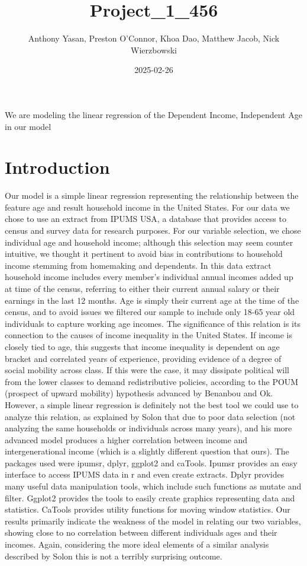 \documentclass[
]{article}
\title{Project\_1\_456}
\author{Anthony Yasan, Preston O'Connor, Khoa Dao, Matthew Jacob, Nick
Wierzbowski}
\date{2025-02-26}
\begin{document}
\maketitle

We are modeling the linear regression of the Dependent Income,
Independent Age in our model

\section{Introduction}\label{introduction}

Our model is a simple linear regression representing the relationship
between the feature age and result household income in the United
States. For our data we chose to use an extract from IPUMS USA, a
database that provides access to census and survey data for research
purposes. For our variable selection, we chose individual age and
household income; although this selection may seem counter intuitive, we
thought it pertinent to avoid bias in contributions to household income
stemming from homemaking and dependents. In this data extract household
income includes every member's individual annual incomes added up at
time of the census, referring to either their current annual salary or
their earnings in the last 12 months. Age is simply their current age at
the time of the census, and to avoid issues we filtered our sample to
include only 18-65 year old individuals to capture working age incomes.
The significance of this relation is its connection to the causes of
income inequality in the United States. If income is closely tied to
age, this suggests that income inequality is dependent on age bracket
and correlated years of experience, providing evidence of a degree of
social mobility across class. If this were the case, it may dissipate
political will from the lower classes to demand redistributive policies,
according to the POUM (prospect of upward mobility) hypothesis advanced
by Benanbou and Ok. However, a simple linear regression is definitely
not the best tool we could use to analyze this relation, as explained by
Solon that due to poor data selection (not analyzing the same households
or individuals across many years), and his more advanced model produces
a higher correlation between income and intergenerational income (which
is a slightly different question that ours). The packages used were
ipumsr, dplyr, ggplot2 and caTools. Ipumsr provides an easy interface to
access IPUMS data in r and even create extracts. Dplyr provides many
useful data manipulation tools, which include such functions as mutate
and filter. Ggplot2 provides the tools to easily create graphics
representing data and statistics. CaTools provides utility functions for
moving window statistics. Our results primarily indicate the weakness of
the model in relating our two variables, showing close to no correlation
between different individuals ages and their incomes. Again, considering
the more ideal elements of a similar analysis described by Solon this is
not a terribly surprising outcome.
\end{document}
